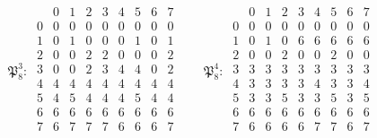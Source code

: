 \documentclass[11pt]{amsart}
\theoremstyle{definition}
\begin{document}
{\begin{gather*}
\mathfrak P_8^{3}:\ \begin{array}{c|cccccccc} & 0 & 1 & 2 & 3 & 4 & 5 & 6 & 7\\ \hline 0 & 0 & 0 & 0 & 0 & 0 & 0 & 0 & 0\\ 1 & 0 & 1 & 0 & 0 & 0 & 1 & 0 & 1\\ 2 & 0 & 0 & 2 & 2 & 0 & 0 & 0 & 2\\ 3 & 0 & 0 & 2 & 3 & 4 & 4 & 0 & 2\\ 4 & 4 & 4 & 4 & 4 & 4 & 4 & 4 & 4\\ 5 & 4 & 5 & 4 & 4 & 4 & 5 & 4 & 4\\ 6 & 6 & 6 & 6 & 6 & 6 & 6 & 6 & 6\\ 7 & 6 & 7 & 7 & 7 & 6 & 6 & 6 & 7\\\end{array}\qquad \mathfrak P_8^{4}:\ \begin{array}{c|cccccccc} & 0 & 1 & 2 & 3 & 4 & 5 & 6 & 7\\ \hline 0 & 0 & 0 & 0 & 0 & 0 & 0 & 0 & 0\\ 1 & 0 & 1 & 0 & 6 & 6 & 6 & 6 & 6\\ 2 & 0 & 0 & 2 & 0 & 0 & 2 & 0 & 0\\ 3 & 3 & 3 & 3 & 3 & 3 & 3 & 3 & 3\\ 4 & 3 & 3 & 3 & 3 & 4 & 3 & 3 & 4\\ 5 & 3 & 3 & 5 & 3 & 3 & 5 & 3 & 5\\ 6 & 6 & 6 & 6 & 6 & 6 & 6 & 6 & 6\\ 7 & 6 & 6 & 6 & 6 & 7 & 7 & 6 & 7\\\end{array}\\[1ex]

\end{gather*}}
\end{document}
